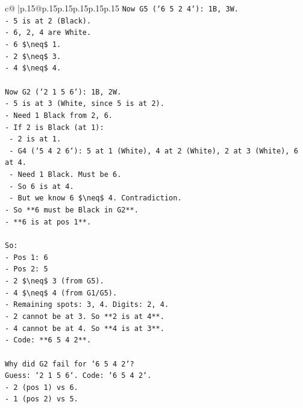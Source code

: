 \documentclass{article}
\begin{document}
{\begin{supertabular}{c@{$\;$}|p{.15\linewidth}@{}p{.15\linewidth}p{.15\linewidth}p{.15\linewidth}p{.15\linewidth}p{.15\linewidth}}
{{{\texttt{Now G5 (`6 5 2 4`): 1B, 3W.} \\
\texttt{{-} 5 is at 2 (Black).} \\
\texttt{{-} 6, 2, 4 are White.} \\
\texttt{{-} 6 \$\textbackslash{}neq\$ 1.} \\
\texttt{{-} 2 \$\textbackslash{}neq\$ 3.} \\
\texttt{{-} 4 \$\textbackslash{}neq\$ 4.} \\
\\ 
\texttt{Now G2 (`2 1 5 6`): 1B, 2W.} \\
\texttt{{-} 5 is at 3 (White, since 5 is at 2).} \\
\texttt{{-} Need 1 Black from 2, 6.} \\
\texttt{{-} If 2 is Black (at 1):} \\
\texttt{  {-} 2 is at 1.} \\
\texttt{  {-} G4 (`5 4 2 6`): 5 at 1 (White), 4 at 2 (White), 2 at 3 (White), 6 at 4.} \\
\texttt{    {-} Need 1 Black. Must be 6.} \\
\texttt{    {-} So 6 is at 4.} \\
\texttt{    {-} But we know 6 \$\textbackslash{}neq\$ 4. Contradiction.} \\
\texttt{{-} So **6 must be Black in G2**.} \\
\texttt{{-} **6 is at pos 1**.} \\
\\ 
\texttt{So:} \\
\texttt{{-} Pos 1: 6} \\
\texttt{{-} Pos 2: 5} \\
\texttt{{-} 2 \$\textbackslash{}neq\$ 3 (from G5).} \\
\texttt{{-} 4 \$\textbackslash{}neq\$ 4 (from G1/G5).} \\
\texttt{{-} Remaining spots: 3, 4. Digits: 2, 4.} \\
\texttt{{-} 2 cannot be at 3. So **2 is at 4**.} \\
\texttt{{-} 4 cannot be at 4. So **4 is at 3**.} \\
\texttt{{-} Code: **6 5 4 2**.} \\
\\ 
\texttt{Why did G2 fail for `6 5 4 2`?} \\
\texttt{Guess: `2 1 5 6`. Code: `6 5 4 2`.} \\
\texttt{{-} 2 (pos 1) vs 6.} \\
\texttt{{-} 1 (pos 2) vs 5.} \\
}}}
\end{supertabular}}
\end{document}
